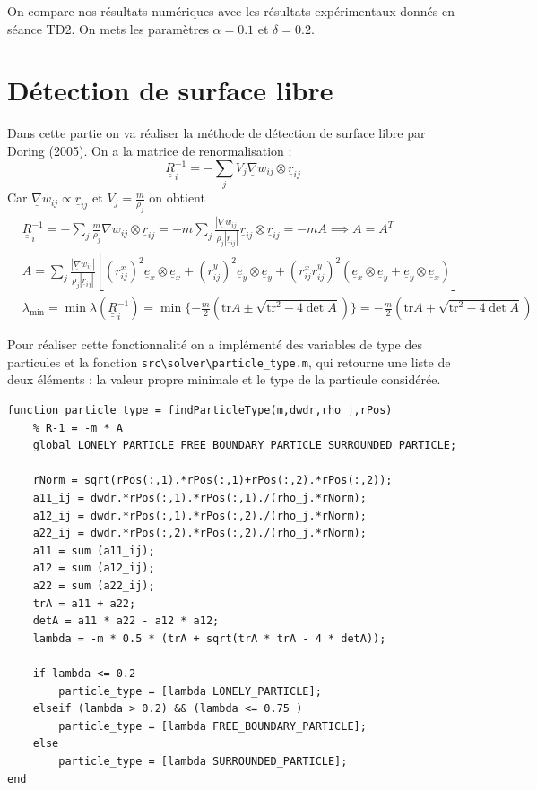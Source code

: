\documentclass{article}
\newcommand\ul[1]{\underline{#1}}
\newcommand\uul[1]{\underline{\underline{#1}}}
\newcommand\uex{\ul{e}_x}
\newcommand\uey{\ul{e}_y}
\begin{document}
On compare nos résultats numériques avec les résultats expérimentaux donnés en séance TD2. On mets les paramètres $\alpha=0.1$ et $\delta=0.2$.\\ 
     
\section{Détection de surface libre}

Dans cette partie on va réaliser la méthode de détection de surface libre par Doring (2005). On a la matrice de renormalisation :
\begin{equation*}
	\uul{R}_i^{-1} = - \sum_{j} V_j \ul{\nabla} w_{ij} \otimes \ul{r}_{ij}
\end{equation*}
Car $\ul{\nabla}w_{ij} \propto \ul{r}_{ij}$ et $V_j = \frac{m}{\rho_j}$ on obtient
\begin{align*}
	& \uul{R}_i^{-1} = - \sum_{j} \frac{m}{\rho_j} \ul{\nabla} w_{ij} \otimes \ul{r}_{ij} = - m \sum_{j} 
	\frac{| \ul{\nabla} w_{ij} |}{\rho_j |\ul{r}_{ij} |} \ul{r}_{ij} \otimes \ul{r}_{ij} = -m A \implies A = A^T \\
	& A = \sum_j \frac{| \ul{\nabla} w_{ij} |}{\rho_j |\ul{r}_{ij} |} \left[ (r_{ij}^x)^2 \uex \otimes \uex + (r_{ij}^y)^2 \uey \otimes \uey + (r_{ij}^x r_{ij}^y)^2 (\uex \otimes \uey + \uey \otimes \uex) \right] \\ 
	& \lambda_{\min} = \min\lambda(\uul{R}_i^{-1}) = \min\{ -\frac{m}{2} (\mathrm{tr} A \pm \sqrt{\mathrm{tr}^2 - 4 \det A}) \} = -\frac{m}{2} (\mathrm{tr} A + \sqrt{\mathrm{tr}^2 - 4 \det A})
\end{align*}

Pour réaliser cette fonctionnalité on a implémenté des variables de type des particules et la fonction \lstinline$src\solver\particle_type.m$, qui retourne une liste de deux éléments : la valeur propre minimale et le type de la particule considérée.
\begin{lstlisting}           
function particle_type = findParticleType(m,dwdr,rho_j,rPos)
    % R-1 = -m * A 
    global LONELY_PARTICLE FREE_BOUNDARY_PARTICLE SURROUNDED_PARTICLE;

    rNorm = sqrt(rPos(:,1).*rPos(:,1)+rPos(:,2).*rPos(:,2)); 
    a11_ij = dwdr.*rPos(:,1).*rPos(:,1)./(rho_j.*rNorm); 
    a12_ij = dwdr.*rPos(:,1).*rPos(:,2)./(rho_j.*rNorm); 
    a22_ij = dwdr.*rPos(:,2).*rPos(:,2)./(rho_j.*rNorm); 
    a11 = sum (a11_ij);
    a12 = sum (a12_ij);
    a22 = sum (a22_ij);
    trA = a11 + a22;
    detA = a11 * a22 - a12 * a12;
    lambda = -m * 0.5 * (trA + sqrt(trA * trA - 4 * detA));

    if lambda <= 0.2 
        particle_type = [lambda LONELY_PARTICLE];
    elseif (lambda > 0.2) && (lambda <= 0.75 ) 
        particle_type = [lambda FREE_BOUNDARY_PARTICLE];
    else 
        particle_type = [lambda SURROUNDED_PARTICLE];
end
\end{lstlisting} 
\end{document}
